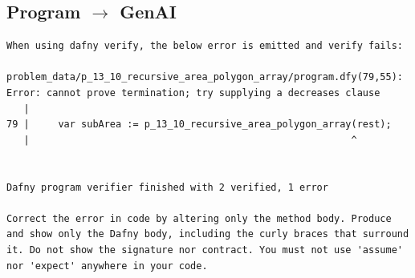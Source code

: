 \documentclass{article}
\begin{document}
\subsection*{Program $\rightarrow$ GenAI}
\begin{lstlisting}
When using dafny verify, the below error is emitted and verify fails:

problem_data/p_13_10_recursive_area_polygon_array/program.dfy(79,55): Error: cannot prove termination; try supplying a decreases clause
   |
79 |     var subArea := p_13_10_recursive_area_polygon_array(rest);
   |                                                        ^


Dafny program verifier finished with 2 verified, 1 error

Correct the error in code by altering only the method body. Produce and show only the Dafny body, including the curly braces that surround it. Do not show the signature nor contract. You must not use 'assume' nor 'expect' anywhere in your code.
\end{lstlisting}
\end{document}
